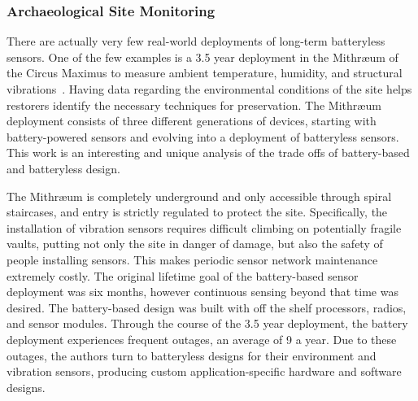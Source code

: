 \subsubsection{Archaeological Site Monitoring}
There are actually very few real-world deployments of long-term batteryless sensors.
One of the few examples is a 3.5 year deployment in the Mithræum of the Circus Maximus to measure ambient temperature, humidity, and structural vibrations~\cite{afanasov2020battery}.
Having data regarding the environmental conditions of the site helps restorers identify the necessary techniques for preservation.
The Mithræum deployment consists of three different generations of devices, starting with battery-powered sensors and evolving into a deployment of batteryless sensors.
This work is an interesting and unique analysis of the trade offs of battery-based and batteryless design.

The Mithræum is completely underground and only accessible through spiral staircases, and entry is strictly regulated to protect the site.
Specifically, the installation of vibration sensors requires difficult climbing on potentially fragile vaults, putting not only the site in danger of damage, but also the safety of people installing sensors.
This makes periodic sensor network maintenance extremely costly.
The original lifetime goal of the battery-based sensor deployment was six months, however continuous sensing beyond that time was desired.
The battery-based design was built with off the shelf processors, radios, and sensor modules.
Through the course of the 3.5 year deployment, the battery deployment experiences frequent outages, an average of 9 a year.
Due to these outages, the authors turn to batteryless designs for their environment and vibration sensors, producing custom application-specific hardware and software designs.

